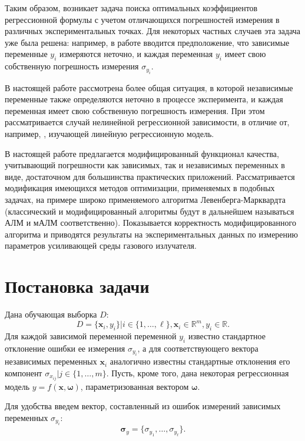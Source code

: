 \documentclass[tikz,11pt,a4paper]{article}
\newcommand{\bomega}{\boldsymbol{\omega}}
\begin{document}
Таким образом, возникает задача поиска оптимальных коэффициентов регрессионной
формулы с учетом отличающихся погрешностей измерения в различных экспериментальных точках.
Для некоторых частных случаев эта задача уже была решена: например, 
в работе \cite{jukic2013nonlinear} вводится предположение, что зависимые переменные $y_i$ измеряются
неточно, и каждая переменная $y_i$ имеет свою собственную погрешность измерения
$\sigma_{y_i}$.

В настоящей работе рассмотрена более общая ситуация, в которой независимые
переменные также определяются неточно в процессе эксперимента, и каждая переменная
имеет свою собственную погрешность измерения. При этом рассматривается случай
нелинейной регрессионной зависимости, в отличие от, например,
\cite{kiryati2000heteroscedastic}, изучающей линейную регрессионную модель.

В настоящей работе предлагается модифицированный функционал качества, учитывающий погрешности как
зависимых, так и независимых переменных в виде, достаточном для большинства
практических приложений. Рассматривается модификация имеющихся методов
оптимизации, применяемых в подобных задачах, на примере широко применяемого
алгоритма Левенберга-Марквардта\cite{Marquardt1963Algorithm} (классический
и модифицированный алгоритмы будут в дальнейшем называться АЛМ и мАЛМ
соответственно).
Показывается корректность модифицированного алгоритма и приводятся
результаты на экспериментальных данных по измерению параметров усиливающей
среды газового излучателя.

\section{Постановка задачи}

Дана обучающая выборка $D$:
\begin{equation}
  D = \{ \mathbf{x}_i, y_i \} | i \in \{ 1, \dots, \ell \}, \mathbf{x}_i \in \mathbb{R}^m, y_i \in \mathbb{R}.
  \label{eq:d}
\end{equation}
Для каждой зависимой переменной переменной $y_i$ известно
стандартное отклонение ошибки ее измерения $\sigma_{y_i}$, а для соответствующего
вектора независимых переменных $\mathbf{x}_i$ аналогично известны стандартные
отклонения его компонент $\sigma_{x_{ij}} | j \in \{ 1, \dots, m \}$.
Пусть, кроме того, дана некоторая регрессионная модель
$y = f (\mathbf{x}, \bomega)$, параметризованная вектором $\bomega$.

Для удобства введем вектор, составленный из ошибок измерений зависимых переменных
$\sigma_{y_i}$:
\[
  \boldsymbol{\sigma}_y = \{ \sigma_{y_1}, \dots, \sigma_{y_{\ell}} \}.
\]
\end{document}

